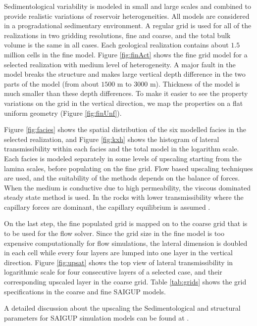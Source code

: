 Sedimentological variability is modeled in small and large scales and combined
to provide realistic variations of reservoir heterogeneities.  All models are considered in a progradational sedimentary environment. A regular grid is used for all of the realizations in two gridding resolutions, fine and coarse, and the total bulk volume is the same in all cases. Each geological realization contains about $1.5$ million cells in the fine model. Figure \ref{fig:finAct} shows the fine grid model for a selected realization with medium level of heterogeneity. A major fault in the model breaks the structure and makes large vertical depth difference in the two parts of the model (from about $1500$ m to $3000$ m).  Thickness of the model is much smaller than these depth differences. To make it easier to see the property variations on the grid in the vertical direction, we map the properties on a flat uniform geometry (Figure \ref{fig:finUnf}).

Figure \ref{fig:facies} shows the spatial distribution of the six modelled facies in the selected realization, and Figure \ref{fig:kxh} shows the histogram of lateral transmissibility within each facies and the total model in the logarithm scale. Each facies is modeled separately in some levels of upscaling starting from the lamina scales, before populating on the fine grid. Flow based upscaling techniques are used, and the suitability of the methods depends on the balance of
forces. When the medium is conductive due to high permeability, the viscous dominated steady state method is used. In the rocks with lower transmissibility where the capillary forces are dominant, the capillary equilibrium is assumed \cite{manzocchi2008sensitivity}.

On the last step, the fine populated grid is mapped on to the coarse grid that is to be used for the flow solver. Since the grid size in the fine model is too expensive computationally for flow simulations, the lateral dimension is doubled in each cell while every four layers are lumped into one layer in the vertical direction. Figure \ref{fig:upsat} shows the top view of lateral transmissibility in logarithmic scale for four consecutive layers of a selected case, and their corresponding upscaled layer in the coarse grid. Table \ref{tab:grids} shows the grid specifications in the coarse and fine SAIGUP models.

A detailed discussion about the upscaling the Sedimentological and structural parameters for SAIGUP simulation models can be found at \cite{manzocchi2008sensitivity}.

